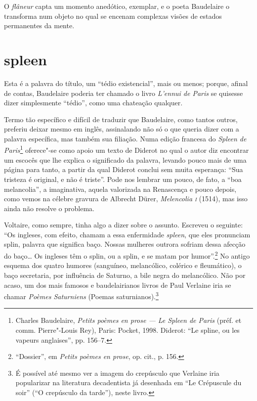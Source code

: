 O \textit{flâneur} capta um momento anedótico, exemplar, e o poeta
Baudelaire o transforma num objeto no qual se encenam complexas visões
de estados permanentes da mente. 

\section*{spleen}
Esta é a palavra do título, um “tédio existencial”, mais ou menos;
porque, afinal de contas, Baudelaire poderia ter chamado o livro
\textit{L’ennui de Paris} se quisesse dizer simplesmente “tédio”, como
uma chateação qualquer.

Termo tão específico e difícil de traduzir que Baudelaire, como tantos
outros, preferiu deixar mesmo em inglês, assinalando não só o que
queria dizer com a palavra específica, mas também sua filiação. Numa
edição francesa do \textit{Spleen de Paris}\footnote{ Charles Baudelaire,
\textit{Petits poèmes en prose --- Le Spleen de Paris} (préf. et
comm. Pierre"-Louis Rey), Paris: Pocket, 1998. Diderot: “Le
spline, ou les vapeurs anglaises”, pp. 156--7.} oferece"-se como
apoio um texto de Diderot no qual o autor diz encontrar um escocês que
lhe explica o significado da palavra, levando pouco mais de uma página
para tanto, a partir da qual Diderot conclui sem muita esperança: “Sua
tristeza é original, e não é triste”. Pode nos lembrar um pouco, de
fato, a “boa melancolia”, a imaginativa, aquela valorizada na
Renascença e pouco depois, como vemos na célebre gravura de Albrecht
Dürer, \textit{Melencolia \textsc{i}} (1514), mas isso ainda não resolve o
problema.

Voltaire, como sempre, tinha algo a dizer sobre o assunto. Escreveu o
seguinte: “Os ingleses, com efeito, chamam a essa enfermidade
\textit{spleen}, que eles pronunciam splin, palavra que significa baço.
Nossas mulheres outrora sofriam dessa afecção do baço… Os ingleses têm
o splin, ou a splin, e se matam por humor”.\footnote{ “Dossier”, em
\textit{Petits poèmes en prose}, op. cit., p. 156.} No antigo esquema dos quatro
humores (sanguíneo, melancólico, colérico e fleumático), o baço
secretaria, por influência de Saturno, a bile negra do melancólico. Não
por acaso, um dos mais famosos e baudelairianos livros de Paul Verlaine
iria se chamar \textit{Poèmes Saturniens} (Poemas
saturnianos).\footnote{ É possível até mesmo ver a imagem do crepúsculo
que Verlaine iria popularizar na literatura decadentista já desenhada
em “Le Crépuscule du soir” (“O crepúsculo da tarde”), neste livro.}

